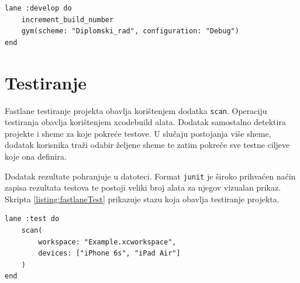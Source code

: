 \documentclass[times, utf8, diplomski, numeric]{fer}
\begin{document}
\begin{appendices}
\begin{lstlisting}[caption=Izgradnja projekta korištenjem gym dodatka, label=listing:fastlaneIzgradnja]
lane :develop do
    increment_build_number
    gym(scheme: "Diplomski_rad", configuration: "Debug")
end
\end{lstlisting}

\section{Testiranje}

Fastlane testiranje projekta obavlja korištenjem dodatka \verb|scan|\citep{fastlane:scan}. Operaciju testiranja obavlja korištenjem xcodebuild alata. Dodatak samostalno detektira projekte i sheme za koje pokreće testove. U slučaju postojanja više sheme, dodatak korisnika traži odabir željene sheme te zatim pokreče sve testne ciljeve koje ona definira.

Dodatak rezultate pohranjuje u  datoteci. Format \verb|junit| je široko prihvaćen naćin zapisa rezultata testova te postoji veliki broj alata za njegov vizualan prikaz. Skripta \ref{listing:fastlaneTest} prikazuje stazu koja obavlja testiranje projekta.

\begin{lstlisting}[caption=Testiranje projekta korištenjem scan dodatka, label=listing:fastlaneTest]
lane :test do
    scan(
        workspace: "Example.xcworkspace",
        devices: ["iPhone 6s", "iPad Air"]
    )
end
\end{lstlisting}


\end{appendices}
\end{document}
